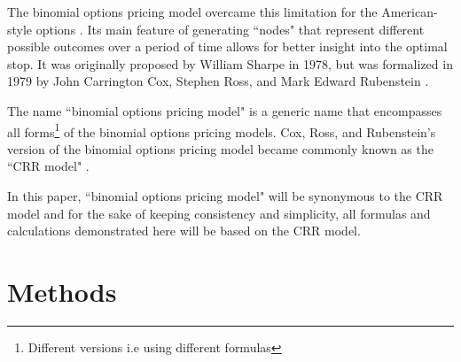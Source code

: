 \documentclass[12pt, letterpaper]{article}\usepackage{float}
\begin{document}
\medskip

The binomial options pricing model overcame this limitation for the American-style options \cite{bopmwikipedia}.
Its main feature of generating ``nodes" that represent different possible outcomes over a period of time allows for better insight into the optimal stop.
It was originally proposed by William Sharpe in 1978, but was formalized in 1979 by John Carrington Cox, Stephen Ross, and Mark Edward Rubenstein \cite{bopmwikipedia}.

\medskip

The name ``binomial options pricing model" is a generic name that encompasses all forms\footnote{Different versions i.e using different formulas} of the binomial options pricing models.
Cox, Ross, and Rubenstein's version of the binomial options pricing model became commonly known as the ``CRR model" \cite{thebinomialmodelcornell}.

\medskip

In this paper, ``binomial options pricing model" will be synonymous to the CRR model and for the sake of keeping consistency and simplicity, all formulas and calculations demonstrated here will be based on the CRR model.

\pagebreak

\section*{Methods}
\end{document}
